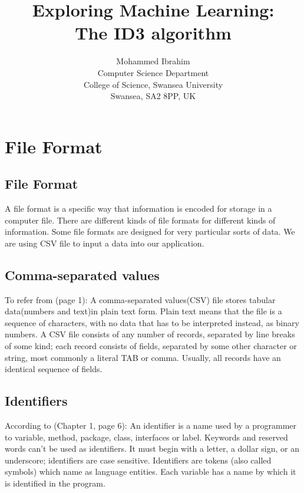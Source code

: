 \documentclass{report}
\begin{document}
\title{Exploring Machine Learning:\\
  The ID3 algorithm}

\author{Mohammed Ibrahim\\
 Computer Science Department\\
  College of Science, Swansea University\\
  Swansea, SA2 8PP, UK
}

\maketitle

\tableofcontents

\chapter{File Format}
\label{sec:fileformat}

\section{File Format}
\label{sec:file}

A file format is a specific way that information is encoded for storage in a computer file. There are different kinds of file formats for different kinds of information. Some file formats are designed for very particular sorts of data.
We are using CSV file to input a data into our application.

\section{Comma-separated values}
\label{sec:csv}

To refer from \cite{Wikipedia_CommaSeparatedValues}(page 1): A comma-separated values(CSV) file stores tabular data(numbers and text)in plain text form. Plain text means that the file is a sequence of characters, with no data that has to be interpreted instead, as binary numbers. A CSV file consists of any number of records, separated by line breaks of some kind; each record consists of fields, separated by some other character or string, most commonly a literal TAB or comma. Usually, all records have an identical sequence of fields.





\section{Identifiers}
\label{sec:ide}

According to \cite{Roberts2000CompleteJava2Certification}(Chapter 1, page 6): An identifier is a name used by a programmer to variable, method, package, class, interfaces or label. Keywords and reserved words can't be used as  identifiers. It must begin with a letter, a dollar sign, or an underscore; identifiers are case sensitive. Identifiers are tokens (also called symbols) which name as language entities. Each variable has a name by which it is identified in the program.







\end{document}
